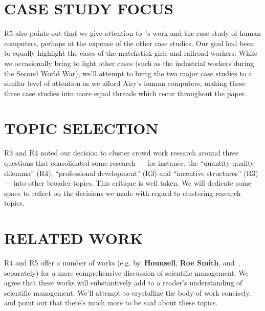 \documentclass[11pt]{article}
\begin{document}

\section{CASE STUDY FOCUS}
R5 also points out that we give attention to~\citeauthor{grier2013computers}'s work and
the case study of human computers,
perhaps at the expense of the other case studies.
Our goal had been to equally highlight the cases of the matchstick girls and railroad workers.
While we occasionally bring to light other cases
(such as the industrial workers during the Second World War),
we'll attempt to bring the two major case studies to
a similar level of attention as we afford Airy's human computers,
making these three case studies into
more equal threads which recur throughout the paper.

\section{TOPIC SELECTION}
R3 and R4 noted our decision to cluster crowd work research around three questions
that consolidated some research
--- for instance, the ``quantity-quality dilemma'' (R4), ``professional development'' (R3) and ``incentive structures'' (R3) --- into other broader topics.
This critique is well taken. We will dedicate some space to reflect on
the decisions we made with regard to clustering research topics.

\section{RELATED WORK}
R4 and R5 offer a number of works
(e.g. by~\textbf{Hounsell}, \textbf{Roe Smith}, and~\citeauthor{williamson2016},
separately)
for a more comprehensive discussion of scientific management.
We agree that these works will
substantively add to a reader's understanding of scientific management.
We'll attempt to crystallize the body of work concisely, and
point out that there's much more to be said about these topics.
\end{document}

